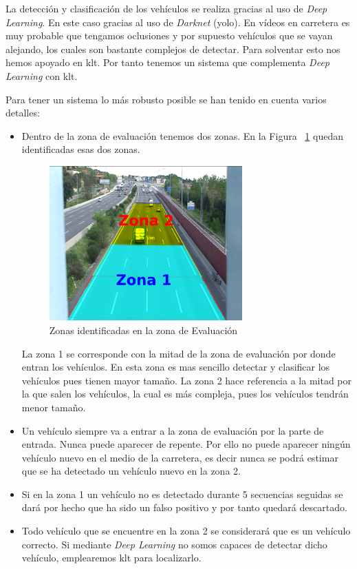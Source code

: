 La detección y clasificación de los vehículos se realiza gracias al uso de \textit{Deep Learning}. En este caso gracias al uso de \textit{Darknet} (\acrshort{yolo}). En vídeos en carretera es muy probable que tengamos oclusiones y por supuesto vehículos que se vayan alejando, los cuales son bastante complejos de detectar. Para solventar esto nos hemos apoyado en \acrfull{klt}. Por tanto tenemos un sistema que complementa \textit{Deep Learning} con \acrshort{klt}. 

Para tener un sistema lo más robusto posible se han tenido en cuenta varios detalles:

\begin{itemize}
    \item Dentro de la zona de evaluación tenemos dos zonas. En la
     Figura ~\ref{fig.zona_evaluacion} quedan identificadas esas dos zonas.
    \begin{figure}[H] 
\begin{center}
	\includegraphics[width=0.7\textwidth]{figures/Diseno_global/zonas_evaluacion.png}
   \caption{Zonas identificadas en la zona de Evaluación}
	\label{fig.zona_evaluacion}
\end{center}

\end{figure}
    La zona 1 se corresponde con la mitad de la zona de evaluación por donde entran los vehículos. En esta zona es mas sencillo detectar y clasificar los vehículos pues tienen mayor tamaño. La zona 2 hace referencia a la mitad por la que salen los vehículos, la cual es más compleja, pues los vehículos tendrán menor tamaño.
    \item Un vehículo siempre va a entrar a la zona de evaluación por la parte de entrada. Nunca puede aparecer de repente. Por ello no puede aparecer ningún vehículo nuevo en el medio de la carretera, es decir nunca se podrá estimar que se ha detectado un vehículo nuevo en la zona 2.
    \item Si en la zona 1 un vehículo no es detectado durante 5 secuencias seguidas se dará por hecho que ha sido un falso positivo y por tanto quedará descartado.
    \item Todo vehículo que se encuentre en la zona 2 se considerará que es un vehículo correcto. Si mediante \textit{Deep Learning} no somos capaces de detectar dicho vehículo, emplearemos \acrshort{klt} para localizarlo. 
\end{itemize}

